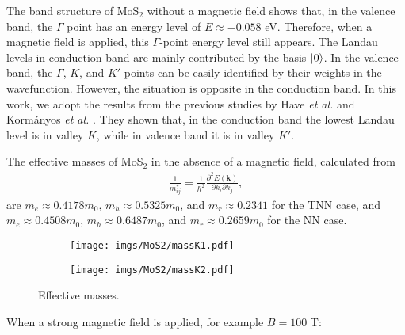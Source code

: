 \documentclass{article}
\begin{document}
The band structure of MoS$_{2}$ without a magnetic field shows that, in the valence band, the $\Gamma$ point has an energy level of $E \approx -0.058$ eV. Therefore, when a magnetic field is applied, this $\Gamma$-point energy level still appears. The Landau levels in conduction band are mainly contributed by the basis $\ket{0}$. In the valence band, the $\Gamma$, $K$, and $K'$ points can be easily identified by their weights in the wavefunction. However, the situation is opposite in the conduction band. In this work, we adopt the results from the previous studies by Have \textit{et al.} and Korm{\'a}nyos \textit{et al.} \cite{have2019,kormanyos2015landau}. They shown that, in the conduction band the lowest Landau level is in valley $K$, while in valence band it is in valley $K'$.

The effective masses of MoS$_{2}$ in the absence of a magnetic field, calculated from
\begin{gather}
	\frac{1}{m_{ij}^{*}} = \frac{1}{\hbar^{2}} \frac{\partial^{2} E(\mathbf{k})}{\partial k_{i}\partial k_{j}},
\end{gather}
are $m_{e} \approx 0.4178 m_{0}$, $m_{h} \approx 0.5325 m_{0}$, and $m_{r} \approx 0.2341$ for the TNN case, and $m_{e} \approx 0.4508 m_{0}$, $m_{h} \approx 0.6487 m_{0}$, and $m_{r} \approx 0.2659 m_{0}$ for the NN case.

\begin{figure}[!h]
	\begin{subfigure}{0.495\textwidth}
		\centering
		\texttt{[image: imgs/MoS2/massK1.pdf]}
	\end{subfigure}
	\begin{subfigure}{0.495\textwidth}
		\centering
		\texttt{[image: imgs/MoS2/massK2.pdf]}
	\end{subfigure}
	\caption{Effective masses.}
\end{figure}
When a strong magnetic field is applied, for example $B = 100$ T:
\end{document}
